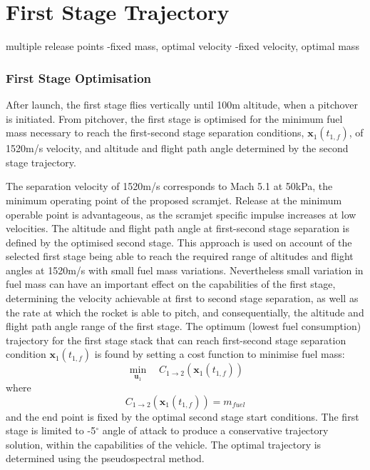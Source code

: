 \section{First Stage Trajectory}
multiple release points
-fixed mass, optimal velocity
-fixed velocity, optimal mass


\subsubsection{First Stage Optimisation}
After launch, the first stage flies vertically until 100m altitude, when a pitchover is initiated. 
From pitchover, the first stage is optimised for the minimum fuel mass necessary to reach the first-second stage separation conditions, $\textbf{x}_1(t_{1,f})$, of 1520m/s velocity, and altitude and flight path angle determined by the second stage trajectory. 

The separation velocity of 1520m/s corresponds to Mach 5.1 at 50kPa, the minimum operating point of the proposed scramjet\cite{Preller2017}. Release at the minimum operable point is advantageous, as the scramjet specific impulse increases at low velocities\cite{Preller2017}.
The altitude and flight path angle at first-second stage separation is defined by the optimised second stage. This approach is used on account of the selected first stage being able to reach the required range of altitudes and flight angles at 1520m/s  with small fuel mass variations. 
Nevertheless small variation in fuel mass can have an important effect on the capabilities of the first stage, determining the velocity achievable at first to second stage separation, as well as the rate at which the rocket is able to pitch, and consequentially, the altitude and flight path angle range of the first stage.
The optimum (lowest fuel consumption) trajectory for the first stage stack that can reach first-second stage separation condition $\textbf{x}_1(t_{1,f})$ is found by setting a cost function to minimise fuel mass:
\begin{equation}
\min\limits_{\textbf{u}_1} \quad  C_{1 \rightarrow 2}(\textbf{x}_1(t_{1,f}))
\end{equation}
where
\begin{equation}
C_{1 \rightarrow 2}(\textbf{x}_1(t_{1,f})) = m_{fuel}
\end{equation}
and the end point is fixed by the optimal second stage start conditions. The first stage is limited to -5$^\circ$ angle of attack to produce a conservative trajectory solution, within the capabilities of the vehicle. The optimal trajectory is determined using the pseudospectral method.




